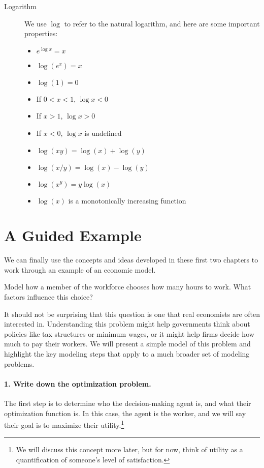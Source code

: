\begin{description}
    \item[Logarithm] We use $\log$ to refer to the natural logarithm, and here are some important properties:
    \begin{itemize}
        \item $e^{\log x} = x$
        \item $\log(e^x) = x$
        \item $\log(1) = 0$
        \item If $0 < x < 1$, $\log x < 0$
        \item If $x > 1$, $\log x > 0$
        \item If $x < 0$, $\log x$ is undefined
        \item $\log(xy) = \log(x) + \log(y)$
        \item $\log(x/y) = \log(x) - \log(y)$
        \item $\log(x^y) = y \log(x)$
        \item $\log(x)$ is a monotonically increasing function
    \end{itemize} 
\end{description}

\section{A Guided Example}

We can finally use the concepts and ideas developed in these first two chapters to work through an example of an economic model. 

\begin{example}
Model how a member of the workforce chooses how many hours to work. What factors influence this choice?
\end{example}

It should not be surprising that this question is one that real economists are often interested in. Understanding this problem might help governments think about policies like tax structures or minimum wages, or it might help firms decide how much to pay their workers. We will present a simple model of this problem and highlight the key modeling steps that apply to a much broader set of modeling problems.

\paragraph{1. Write down the optimization problem.}

The first step is to determine who the decision-making agent is, and what their optimization function is. In this case, the agent is the worker, and we will say their goal is to maximize their utility.\footnote{We will discuss this concept more later, but for now, think of utility as a quantification of someone's level of satisfaction.} 

